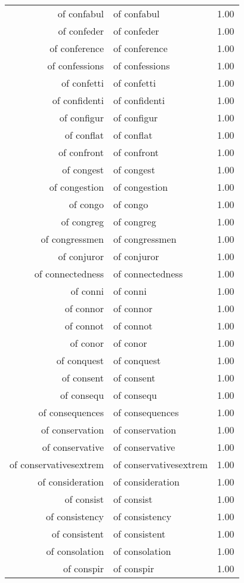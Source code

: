 \begin{table}[ht]
\begin{tabular}{rlr}
  of confabul & of confabul & 1.00 \\ 
  of confeder & of confeder & 1.00 \\ 
  of conference & of conference & 1.00 \\ 
  of confessions & of confessions & 1.00 \\ 
  of confetti & of confetti & 1.00 \\ 
  of confidenti & of confidenti & 1.00 \\ 
  of configur & of configur & 1.00 \\ 
  of conflat & of conflat & 1.00 \\ 
  of confront & of confront & 1.00 \\ 
  of congest & of congest & 1.00 \\ 
  of congestion & of congestion & 1.00 \\ 
  of congo & of congo & 1.00 \\ 
  of congreg & of congreg & 1.00 \\ 
  of congressmen & of congressmen & 1.00 \\ 
  of conjuror & of conjuror & 1.00 \\ 
  of connectedness & of connectedness & 1.00 \\ 
  of conni & of conni & 1.00 \\ 
  of connor & of connor & 1.00 \\ 
  of connot & of connot & 1.00 \\ 
  of conor & of conor & 1.00 \\ 
  of conquest & of conquest & 1.00 \\ 
  of consent & of consent & 1.00 \\ 
  of consequ & of consequ & 1.00 \\ 
  of consequences & of consequences & 1.00 \\ 
  of conservation & of conservation & 1.00 \\ 
  of conservative & of conservative & 1.00 \\ 
  of conservativesextrem & of conservativesextrem & 1.00 \\ 
  of consideration & of consideration & 1.00 \\ 
  of consist & of consist & 1.00 \\ 
  of consistency & of consistency & 1.00 \\ 
  of consistent & of consistent & 1.00 \\ 
  of consolation & of consolation & 1.00 \\ 
  of conspir & of conspir & 1.00 \\ 

\end{tabular}
\end{table}
